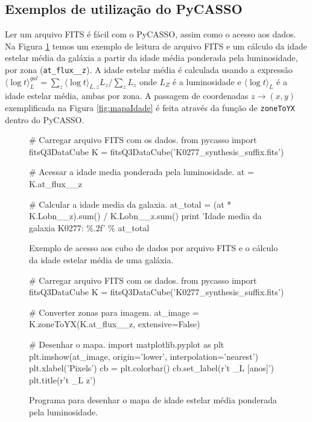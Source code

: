\subsection{Exemplos de utilização do PyCASSO}

Ler um arquivo FITS é fácil com o PyCASSO, assim como o acesso aos dados. Na Figura \ref{fig:dataAccess} temos um
exemplo de leitura de arquivo FITS e um cálculo da idade estelar média da galáxia a partir da idade média ponderada pela
luminosidade, por zona (\texttt{at\_flux\_\_z}). A idade estelar média é calculada usando a expressão $ \langle \log t
\rangle^{gal}_L = \sum_z \langle \log t \rangle_{L,z} L_z /\sum_z L_z$ onde $L_Z $ é a luminosidade e $ \langle \log t
\rangle_L $ é a idade estelar média, ambas por zona.  A passagem de coordenadas $z \to (x, y)$ exemplificada na Figura
\ref{fig:mapaIdade} é feita através da função de \texttt{zoneToYX} dentro do PyCASSO.

\begin{figure}
\begin{python}
# Carregar arquivo FITS com os dados.
from pycasso import fitsQ3DataCube
K = fitsQ3DataCube('K0277_synthesis_suffix.fits')

# Acessar a idade media ponderada pela luminosidade.
at = K.at_flux__z

# Calcular a idade media da galaxia.
at_total = (at * K.Lobn__z).sum() / K.Lobn__z.sum()
print 'Idade media da galaxia K0277: \%.2f' \% at_total
\end{python}
	\caption[Exemplo de programa utilizando PyCASSO]
	{Exemplo de acesso aos cubo de dados por arquivo FITS e o cálculo da idade
	estelar média de uma galáxia.}
	\label{fig:dataAccess}
\end{figure}


\begin{figure}
\begin{python}
# Carregar arquivo FITS com os dados.
from pycasso import fitsQ3DataCube
K = fitsQ3DataCube('K0277_synthesis_suffix.fits')

# Converter zonas para imagem.
at_image = K.zoneToYX(K.at_flux__z, extensive=False)

# Desenhar o mapa.
import matplotlib.pyplot as plt
plt.imshow(at_image, origin='lower', interpolation='nearest')
plt.xlabel('Pixels')
cb = plt.colorbar()
cb.set_label(r'\langle \log t \langle_L [anos]')
plt.title(r'\langle \log t \langle_{L z}')

\end{python}
	\caption[Programa idade estelar média]
	{Programa para desenhar o mapa de idade	estelar média ponderada pela 
	luminosidade.}
	\label{fig:programaMapaIdade}
\end{figure}

